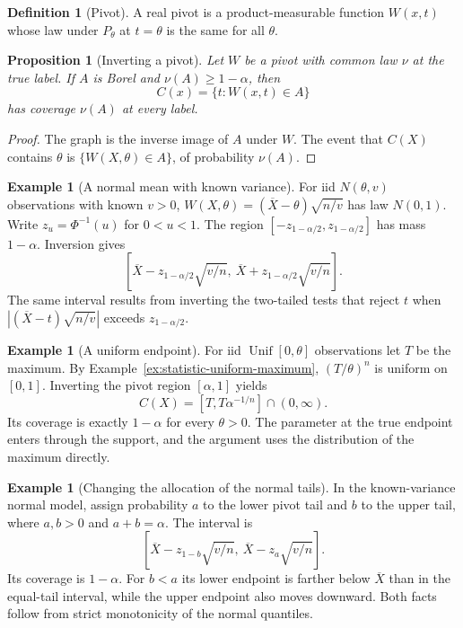 \documentclass[11pt,oneside]{book}
\newtheorem{proposition}[theorem]{Proposition}
\theoremstyle{definition}
\newtheorem{definition}[theorem]{Definition}
\newtheorem{example}[theorem]{Example}
\theoremstyle{remark}
\begin{document}
\begin{definition}[Pivot]
\label{def:confidence-pivot}
A real pivot is a product-measurable function $W(x,t)$ whose
law under $P_\theta$ at $t=\theta$ is the same for all $\theta$.
\end{definition}

\begin{proposition}[Inverting a pivot]
\label{prop:confidence-pivot-inversion}
Let $W$ be a pivot with common law $\nu$ at the true label.
If $A$ is Borel and $\nu(A)\geq1-\alpha$, then
\[
C(x)=\{t:W(x,t)\in A\}
\]
has coverage $\nu(A)$ at every label.
\end{proposition}
\begin{proof}
The graph is the inverse image of $A$ under $W$. The event
that $C(X)$ contains $\theta$ is $\{W(X,\theta)\in A\}$, of
probability $\nu(A)$.
\end{proof}

\begin{example}[A normal mean with known variance]
\label{ex:confidence-normal-known-variance}
For iid $N(\theta,v)$ observations with known $v>0$,
$W(X,\theta)=(\overline X-\theta)\sqrt{n/v}$ has law $N(0,1)$.
Write $z_u=\Phi^{-1}(u)$ for $0<u<1$. The region
$[-z_{1-\alpha/2},z_{1-\alpha/2}]$ has mass $1-\alpha$.
Inversion gives
\[
\left[\overline X-z_{1-\alpha/2}\sqrt{v/n},\
      \overline X+z_{1-\alpha/2}\sqrt{v/n}\right].
\]
The same interval results from inverting the two-tailed
tests that reject $t$ when $|(\overline X-t)\sqrt{n/v}|$
exceeds $z_{1-\alpha/2}$.
\end{example}

\begin{example}[A uniform endpoint]
\label{ex:confidence-uniform-endpoint}
For iid $\operatorname{Unif}[0,\theta]$ observations let $T$ be
the maximum. By Example~\ref{ex:statistic-uniform-maximum},
$(T/\theta)^n$ is uniform on $[0,1]$. Inverting the pivot
region $[\alpha,1]$ yields
\[
C(X)=[T,T\alpha^{-1/n}]\cap(0,\infty).
\]
Its coverage is exactly $1-\alpha$ for every $\theta>0$.
The parameter at the true endpoint enters through the support,
and the argument uses the distribution of the maximum directly.
\end{example}


\begin{example}[Changing the allocation of the normal tails]
\label{ex:confidence-normal-tail-allocation}
In the known-variance normal model, assign probability $a$
to the lower pivot tail and $b$ to the upper tail, where
$a,b>0$ and $a+b=\alpha$. The interval is
\[
[\overline X-z_{1-b}\sqrt{v/n},\
 \overline X-z_a\sqrt{v/n}].
\]
Its coverage is $1-\alpha$. For $b<a$ its lower endpoint
is farther below $\overline X$ than in the equal-tail
interval, while the upper endpoint also moves downward.
Both facts follow from strict monotonicity of the normal quantiles.
\end{example}
\end{document}
